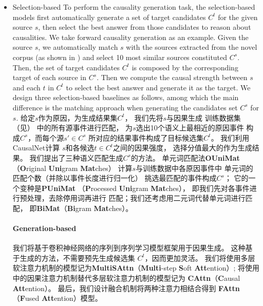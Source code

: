 \begin{itemize}
\item{Selection-based}
To perform the causality generation task, 
the selection-based models first automatically generate a set of target candidates $C^t$ for the given source $s$, 
then select the best answer from those candidates to reason about causalities. 
We take forward causality generation as an example.
Given the source $s$, we automatically match $s$ with the sources extracted from 
the novel corpus (as shown in ) and select 10 most similar sources constituted $C^s$. 
Then, the set of target candidates $C^t$ is composed by the corresponding target of each source in $C^s$.
Then we compute the causal strength between 
$s$ and each $t$ in $C^t$ to select the best answer 
and generate it as the target.
We design three selection-based baselines as follows,
among which the main difference is 
the matching approach when generating the candidates set $C^s$ for $s$.
给定$s$作为原因，为生成结果集$C^t$，
我们先将$s$与因果生成
训练数据集（见）
中的所有源事件进行匹配，
为$s$选出10个语义上最相近的原因事件
构成$C^s$，而每个源$s' \in C^s$
所对应的结果事件构成了目标候选集$C^t$。
我们利用CausalNet计算
$s$和各候选$t \in C^t$之间的因果强度，
选择分值最大的作为生成结果。
我们提出了三种语义匹配生成$C^s$的方法。
单元词匹配法\textbf{OUniMat}（\textbf{O}riginal \textbf{Uni}gram \textbf{Mat}ches）
计算$s$与训练数据中各原因事件中
单元词的匹配个数（并除以事件长度进行归一化）
挑选最匹配的事件构成$C^s$；
它的一个变种是\textbf{PUniMat}
（\textbf{P}rocessed \textbf{Uni}gram \textbf{Mat}ches），
即我们先对各事件进行预处理，去除停用词再进行
匹配；我们还考虑用二元词代替单元词进行匹配，
即\textbf{BiMat}（\textbf{Bi}gram \textbf{Mat}ches）。

\paragraph{Generation-based}
我们将基于卷积神经网络的序列到序列学习模型框架用于因果生成。
这种基于生成的方法，不需要预先生成候选集
$C^t$，因而更加灵活。
我们将使用多层软注意力机制的模型记为\textbf{MultiSAttn}（\textbf{Multi}-step \textbf{S}oft \textbf{Att}ention）;
将使用中的因果注意力机制替代多层软注意力机制的模型记为
\textbf{CAttn}（\textbf{C}ausal \textbf{Att}ention）。
最后，我们设计融合机制将两种注意力相结合得到
\textbf{FAttn}（\textbf{F}used \textbf{Att}ention）模型。



\end{itemize}
